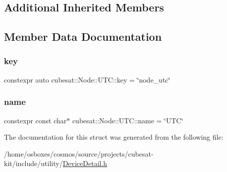 \subsection*{Additional Inherited Members}


\subsection{Member Data Documentation}
\mbox{\label{structcubesat_1_1Node_1_1UTC_abc6c259871e7208ca0431fc3d23cefea}} 
\subsubsection{\texorpdfstring{key}{key}}
{\footnotesize\ttfamily constexpr auto cubesat\+::\+Node\+::\+U\+T\+C\+::key = \char`\"{}node\+\_\+utc\char`\"{}\hspace{0.3cm}{\ttfamily [static]}}

\mbox{\label{structcubesat_1_1Node_1_1UTC_aac5ffbb9b9d01262dc72cfd1cb06572c}} 
\subsubsection{\texorpdfstring{name}{name}}
{\footnotesize\ttfamily constexpr const char$\ast$ cubesat\+::\+Node\+::\+U\+T\+C\+::name = \char`\"{}U\+TC\char`\"{}\hspace{0.3cm}{\ttfamily [static]}}



The documentation for this struct was generated from the following file\+:\begin{DoxyCompactItemize}
\item 
/home/osboxes/cosmos/source/projects/cubesat-\/kit/include/utility/\hyperlink{DeviceDetail_8h}{Device\+Detail.\+h}\end{DoxyCompactItemize}
